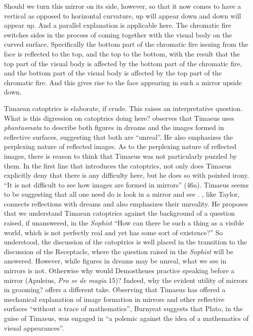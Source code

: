 Should we turn this mirror on its side, however, so that it now comes to have a vertical as opposed to horizontal curvature, up will appear down and down will appear up. And a parallel explanation is applicable here. The chromatic fire switches sides in the process of coming together with the visual body on the curved surface. Specifically the bottom part of the chromatic fire issuing from the face is reflected to the top, and the top to the bottom, with the result that the top part of the visual body is affected by the bottom part of the chromatic fire, and the bottom part of the visual body is affected by the top part of the chromatic fire. And this gives rise to the face appearing in such a mirror upside down.

Timaean catoptrics is elaborate, if crude. This raises an interpretative question. What is this digression on catoptrics doing here? \citet[285]{Taylor:1928qb} observes that Timae\-us uses \emph{phantasmata} to describe both figures in dreams and the images formed in reflective surfaces, suggesting that both are ``unreal''. He also emphasizes the perplexing nature of reflected images. As to the perplexing nature of reflected images, there is reason to think that Timaeus was not particularly puzzled by them. In the first line that introduces the catoptrics, not only does Timaeus explicitly deny that there is any difficulty here, but he does so with pointed irony. ``It is not difficult to see how images are formed in mirrors'' (46a). Timaeus seems to be suggesting that all one need do is look in a mirror and see \citep[47]{Burnyeat:2005rc}. \citet[156]{Cornford:1935fk}, like Taylor, connects reflections with dreams and also emphasizes their unreality. He proposes that we understand Timaean catoptrics against the background of a question raised, if unanswered, in the \emph{Sophist} ``How can there be such a thing as a visible world, which is not perfectly real and yet has some sort of existence?'' So understood, the discussion of the catoptrics is well placed in the transition to the discussion of the Receptacle, where the question raised in the \emph{Sophist} will be answered. However, while figures in dreams may be unreal, what we see in mirrors is not. Otherwise why would Demosthenes practice speaking before a mirror (Apuleius, \emph{Pro se de magia} 15)? Indeed, why the evident utility of mirrors in grooming? \citet[47--8]{Burnyeat:2005rc} offers a different take. Observing that Timaeus has offered a mechanical explanation of image formation in mirrors and other reflective surfaces ``without a trace of mathematics'', Burnyeat suggests that Plato, in the guise of Timaeus, was engaged in ``a polemic against the idea of a mathematics of visual appearances''. 

